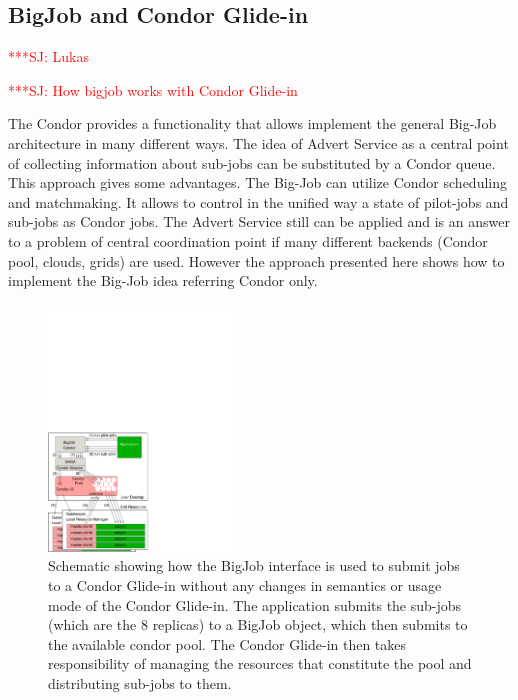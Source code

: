 \documentclass[conference,final]{IEEEtran}
\newcommand{\jhanote}[1]{ {\textcolor{red} { ***SJ: #1 }}}
\newcommand{\jhanote}[1]{}
\begin{document}
\subsection{BigJob and Condor Glide-in} \jhanote{Lukas}


\jhanote{How bigjob works with Condor Glide-in}

The Condor provides a functionality that allows implement the general Big-Job 
architecture in many different ways. The idea of Advert Service as a central 
point of collecting information about sub-jobs can be substituted by a Condor 
queue. This approach gives some advantages. The Big-Job can utilize Condor 
scheduling and matchmaking. It allows to control in the unified way a state of 
pilot-jobs and sub-jobs as Condor jobs. The Advert Service still can be applied 
and is an answer to a problem of central coordination point if many different 
backends (Condor pool, clouds, grids) are used.  However the approach presented 
here shows how to implement the Big-Job idea referring Condor only.

\begin{figure}[!ht]
 \begin{center}
     \includegraphics[width=0.45\textwidth]{figures/bigjob_condor}
 \end{center}
 \caption{\small Schematic showing how the BigJob interface is used to
   submit jobs to a Condor Glide-in without any changes in semantics
   or usage mode of the Condor Glide-in. The application submits the
   sub-jobs (which are the 8 replicas) to a BigJob object, which then
   submits to the available condor pool. The Condor Glide-in then
   takes responsibility of managing the resources that constitute the
   pool and distributing sub-jobs to them.} \label{fig:saga-condor}
\end{figure}
\end{document}

